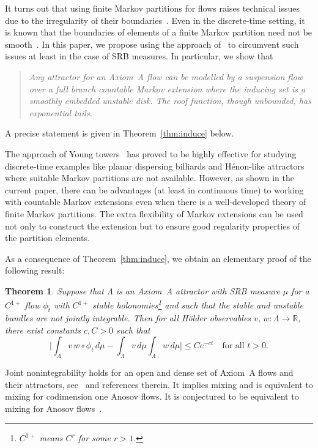\documentclass[12pt]{article}
\numberwithin{equation}{section}
\newtheorem{thm}{Theorem}[section]
\newcommand{\R}{{\mathbb R}}
\begin{document}
It turns out that using finite Markov partitions for flows raises technical issues due to the irregularity of their boundaries~\cite{ABV18,ButterleyWar20,Stoyanov11}. 
Even in the discrete-time setting, it is known that the boundaries of elements of a finite Markov partition need not be smooth~\cite{Bowen78}.
In this paper, we propose using the approach of~\cite{Young98} to circumvent such issues at least in the case of SRB measures. In particular, we show that 
\begin{quote}
\emph{Any attractor for an Axiom~A flow can be modelled by a suspension flow over a full branch countable Markov extension where the inducing set is a smoothly embedded unstable disk. The roof function, though unbounded, has exponential tails.}
\end{quote}
A precise statement is given in Theorem~\ref{thm:induce} below.

\begin{rmk} The approach of Young towers~\cite{Young98} has proved to be highly effective for studying discrete-time examples like planar dispersing billiards and H\'enon-like attractors where suitable Markov partitions are not available. However, as shown in the current paper, there can be advantages (at least in continuous time) to working with countable Markov extensions even when there is a well-developed theory of finite Markov partitions. The extra flexibility of Markov extensions can be used not only to construct the extension but to ensure good regularity properties of the partition elements.
\end{rmk}

As a consequence of Theorem~\ref{thm:induce}, we obtain an elementary proof of the following result:

\begin{thm} \label{thm:A}
 Suppose that $\Lambda$ is an Axiom~A attractor with SRB measure $\mu$ for 
a $C^{1+}$ flow $\phi_t$ with 
$C^{1+}$ stable holonomies\footnote{$C^{1+}$ means $C^r$ for some $r>1$.}
and such that the stable and unstable bundles are not jointly integrable.
Then for all H\"older observables $v,\,w:\Lambda\to\R$,
there exist constants $c,C>0$ such that
\[
\Big|\int_\Lambda v\,w\circ \phi_t\,d\mu
-\int_\Lambda v\,d\mu \int_\Lambda w\,d\mu\Big|\le C e^{-c t}
\quad\text{for all $t>0$}. 
\]
\end{thm}

\begin{rmk}
Joint nonintegrability holds for an open and dense set of Axiom~A flows and their attractors, see~\cite{FMT07} and references therein. 
It implies mixing and is equivalent to mixing for codimension one Anosov flows. It is conjectured to be equivalent to mixing for Anosov flows~\cite{Plante72}.
\end{rmk}
\end{document}
